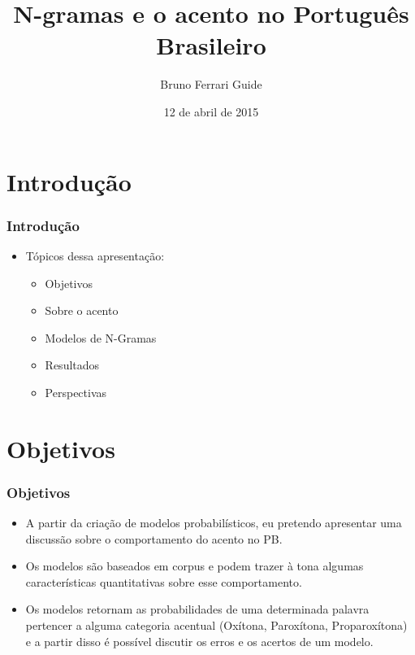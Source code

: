 \documentclass[xcolor=table]{beamer}
\author{Bruno Ferrari Guide}
\title{N-gramas e o acento no Português Brasileiro}
\institute{Orientador: Marcelo Barra Ferreira\\ Departamento de Linguística - FFLCH - USP}
\date{12 de abril de 2015}
\begin{document}
	\maketitle
	\section{Introdução}
	\begin{frame}
		\frametitle{Introdução}
		\begin{itemize}
			\item Tópicos dessa apresentação:\\
			\begin{itemize}
				\item Objetivos\\
				\item Sobre o acento\\
				\item Modelos de N-Gramas\\
				\item Resultados\\
				\item Perspectivas\\
			\end{itemize}
		\end{itemize}
	\end{frame}


	\section{Objetivos}
	\begin{frame}
		\frametitle{Objetivos}
		\begin{itemize}
			\item A partir da criação de modelos probabilísticos, eu pretendo apresentar uma discussão sobre o comportamento do acento no PB.\\
			\item Os modelos são baseados em corpus e podem trazer à tona algumas características quantitativas sobre esse comportamento.\\
			\item Os modelos retornam as probabilidades de uma determinada palavra pertencer a alguma categoria acentual (Oxítona, Paroxítona, Proparoxítona) e a partir disso é possível discutir os erros e os acertos de um modelo.\\
		\end{itemize}
	\end{frame}
\end{document}

